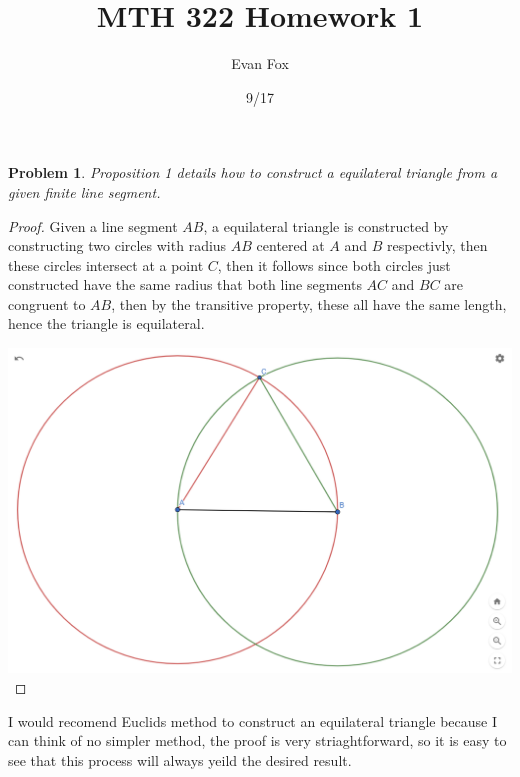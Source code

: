 \documentclass{article}
\title{MTH 322 Homework 1}
\author{Evan Fox}
\date{9/17}
\newtheorem{prb}{Problem}
\begin{document}
\maketitle

\begin{prb} 
	Proposition 1 details how to construct a equilateral triangle from a given finite line segment.  
\end{prb} 
\begin{proof}
	Given a line segment $AB$, a equilateral triangle is constructed by constructing two circles with radius $AB$ centered at $A$ and $B$ respectivly, 
	then these circles intersect at a point $C$, then it follows since both circles just constructed have the 
	same radius that both line segments $AC$ and $BC$ are congruent to $AB$, then by
	the transitive property, these all have the same length, hence the triangle is equilateral.

	\bigskip

	\includegraphics[scale = .5]{equilateral-triangle.png}
\end{proof} 
\noindent I would recomend Euclids method to construct an equilateral triangle because I can think of no simpler method, the proof is very striaghtforward, so it is
easy to see that this process will always yeild the desired result. 
\end{document}
